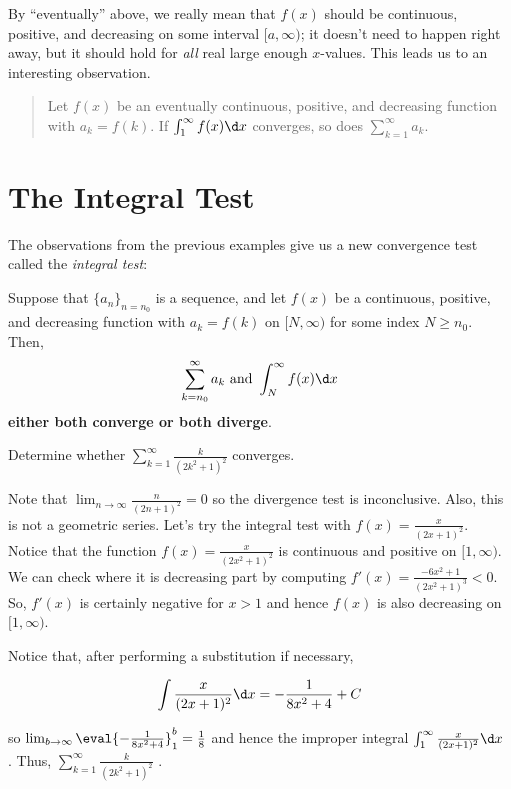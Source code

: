 \documentclass{ximera}
\begin{document}
By ``eventually'' above, we really mean that $f(x)$ should be continuous, positive, and decreasing on some interval $[a,\infty)$; it doesn't need to happen right away, but it should hold for \emph{all} real large enough $x$-values.  This leads us to an interesting observation.
\begin{quote}
  Let $f(x)$ be an eventually continuous, positive, and decreasing function with
    $a_k = f(k)$.  If $\int_1^\infty f(x) \d x$ converges, so does
    $\sum_{k=1}^\infty a_k$.
\end{quote}

\section{The Integral Test}
The observations from the previous examples give us a new convergence test called the \textit{integral test}:
\begin{theorem}
  Suppose that $\{a_n\}_{n=n_0}$ is a sequence, and let $f(x)$ be a continuous, positive, and decreasing function
    with $a_k = f(k)$ on $[N,\infty)$ for some index $N \geq n_0$.  Then, 
    \[
    \sum_{k=n_0}^\infty a_k\text{ and }\int_N^\infty f(x) \d x
    \]
    \textbf{either both converge or both diverge}.
\end{theorem}

\begin{example}
Determine whether $\sum_{k=1}^{\infty} \frac{k}{(2k^2+1)^2}$ converges.

\begin{explanation}
Note that $\lim_{n \to \infty}  \frac{n}{(2n+1)^2} =0$ so the divergence test is inconclusive.  Also, this is not a geometric series.  Let's try the integral test with $f(x) =  \frac{x}{(2x+1)^2}$.  Notice that the function $f(x) = \frac{x}{(2x^2+1)^2}$ is continuous and positive on $[1,\infty)$.  We can check where it is decreasing part by computing $f'(x) = \frac{-6x^2+1}{(2x^2+1)^3} < 0$.  So, $f'(x)$ is certainly negative for $x >1$ and hence $f(x)$ is also decreasing on $[1,\infty)$.

Notice that, after performing a substitution if necessary,  

\[
\int \frac{x}{(2x+1)^2} \d x = -\frac{1}{8x^2+4} +C
\]

so $\lim_{b \to \infty} \eval{ -\frac{1}{8x^2+4}}_1^b = \frac{1}{8}$ and hence the improper integral $\int_1^{\infty}  \frac{x}{(2x+1)^2} \d x $ .  Thus,  $\sum_{k=1}^{\infty} \frac{k}{(2k^2+1)^2}$ .

\end{explanation}

\end{example}
\end{document}
